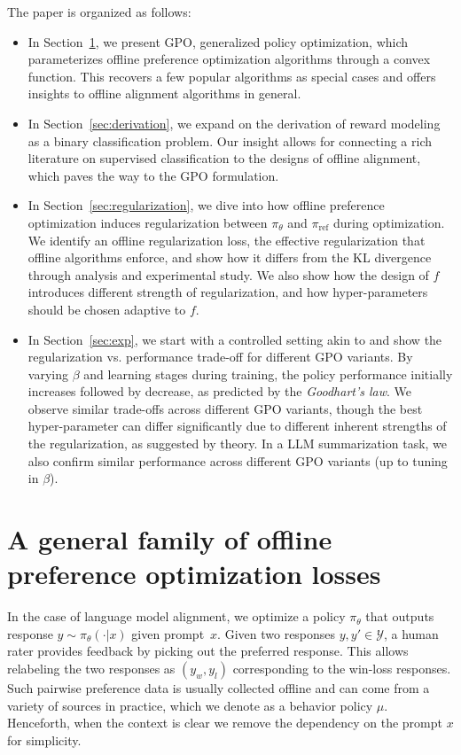 The paper is organized as follows:
\begin{itemize}
    \item In Section~\ref{sec:gpo}, we present GPO, generalized policy optimization, which parameterizes offline preference optimization algorithms through a convex function. This recovers a few popular algorithms as special cases and offers insights to offline alignment algorithms in general.
    \item In Section~\ref{sec:derivation}, we expand on the derivation of reward modeling as a binary classification problem. Our insight allows for connecting a rich literature on supervised classification to the designs of offline alignment, which paves the way to the GPO formulation.
    \item In Section~\ref{sec:regularization}, we dive into how offline preference optimization induces regularization between $\pi_\theta$ and $\pi_\text{ref}$ during optimization. We identify an offline regularization loss, the effective regularization that offline algorithms enforce, and show how it differs from the KL divergence through analysis and experimental study. We also show how the design of $f$ introduces different strength of regularization, and how hyper-parameters should be chosen adaptive to $f$.
    \item In Section~\ref{sec:exp}, we start with a controlled setting akin to \citet{gao2023scaling} and show the regularization vs. performance trade-off for different GPO variants. By varying $\beta$ and learning stages during training, the policy performance initially increases followed by decrease, as predicted by the \emph{Goodhart's law}. We observe similar trade-offs across different GPO variants, though the best hyper-parameter can differ significantly due to different inherent strengths of the regularization, as suggested by theory. In a LLM summarization task, we also confirm similar performance across different GPO variants (up to tuning in $\beta$).
\end{itemize}

\section{A general family of offline preference optimization losses} \label{sec:gpo}

In the case of language model alignment, we optimize a policy $\pi_\theta$ that outputs response $y\sim \pi_\theta(\cdot|x)$ given prompt~$x$. Given two responses $y,y'\in\mathcal{Y}$, a human rater provides feedback by picking out the preferred response. This allows relabeling the two responses as $(y_w,y_l)$ corresponding to the win-loss responses. Such pairwise preference data is usually collected offline and can come from a variety of sources in practice, which we denote as a behavior policy $\mu$. Henceforth, when the context is clear we remove the dependency on the prompt $x$ for simplicity.

